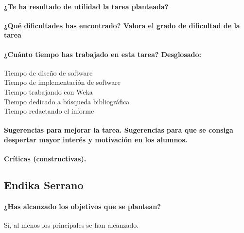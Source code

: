 \documentclass[11pt, titlepage,a4paper]{article}
\begin{document}
\paragraph{¿Te ha resultado de utilidad la tarea planteada?\\}

\paragraph{¿Qué dificultades has encontrado? Valora el grado de dificultad de
la tarea\\}

\paragraph{¿Cuánto tiempo has trabajado en esta tarea? Desglosado:\\}
\begin{description}
	\item[Tiempo de diseño de software]
	\item[Tiempo de implementación de software]
	\item[Tiempo trabajando con Weka]
	\item[Tiempo dedicado a búsqueda bibliográfica]
	\item[Tiempo redactando el informe]
\end{description}

\paragraph{Sugerencias para mejorar la tarea. Sugerencias para que se consiga despertar mayor
interés y motivación en los alumnos.\\}

\paragraph{Críticas (constructivas).\\}

\subsection{Endika Serrano}
\paragraph{¿Has alcanzado los objetivos que se plantean?\\}
Sí, al menos los principales se han alcanzado.
\end{document}
